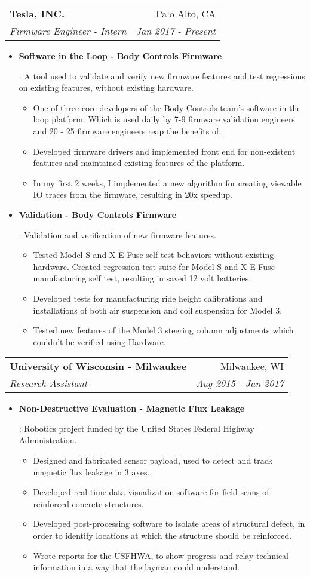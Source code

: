 \documentclass[letterpaper,11pt]{article}
\makeatletter
\newcommand{\resumeItem}[2]{
  \item\small{
    \textbf{#1}{: #2 \vspace{-2pt}}
  }
}
\newcommand{\resumeSubheading}[4]{
  \vspace{-1pt}\item
    \begin{tabular*}{0.97\textwidth}{l@{\extracolsep{\fill}}r}
      \textbf{#1} & #2 \\
      \textit{\small#3} & \textit{\small #4} \\
    \end{tabular*}\vspace{-5pt}
}
\newcommand{\resumeItemListStart}{\begin{itemize}}
\newcommand{\resumeItemListEnd}{\end{itemize}\vspace{-5pt}}
\makeatother
\begin{document}
    \resumeSubheading
      {Tesla, INC.}{Palo Alto, CA}
      {Firmware Engineer - Intern}{Jan 2017 - Present}
      \resumeItemListStart
        \resumeItem{Software in the Loop - Body Controls Firmware}
          {A tool used to validate and verify new firmware features and test regressions on existing features, without existing hardware.
          \begin{itemize}
          \item One of three core developers of the Body Controls team's software in the loop platform. Which is used daily by 7-9 firmware validation engineers and 20 - 25 firmware engineers reap the benefits of.
          \item Developed firmware drivers and implemented front end for non-existent features and maintained existing features of the platform.
          \item In my first 2 weeks, I implemented a new algorithm for creating viewable IO traces from the firmware, resulting in 20x speedup.
          \end{itemize}}
        \resumeItem{Validation - Body Controls Firmware}
          {Validation and verification of new firmware features.
          \begin{itemize}
          	\item Tested Model S and X E-Fuse self test behaviors without existing hardware. Created regression test suite for Model S and X E-Fuse manufacturing self test, resulting in saved 12 volt batteries.
            \item Developed tests for manufacturing ride height calibrations and installations of both air suspension and coil suspension for Model 3.
            \item Tested new features of the Model 3 steering column adjustments which couldn't be verified using Hardware.
          \end{itemize}}
      \resumeItemListEnd

    \resumeSubheading
      {University of Wisconsin - Milwaukee}{Milwaukee, WI}
      {Research Assistant}{Aug 2015 - Jan 2017}
      \resumeItemListStart
        \resumeItem{Non-Destructive Evaluation - Magnetic Flux Leakage}
          {Robotics project funded by the United States Federal Highway Administration.
          \begin{itemize}
          	\item Designed and fabricated sensor payload, used to detect and track magnetic flux leakage in 3 axes.
            \item Developed real-time data visualization software for field scans of reinforced concrete structures.
            \item Developed post-processing software to isolate areas of structural defect, in order to identify locations at which the structure should be reinforced.
            \item Wrote reports for the USFHWA, to show progress and relay technical information in a way that the layman could understand. 
            \end{itemize}}
        \resumeItemListEnd
\end{document}
